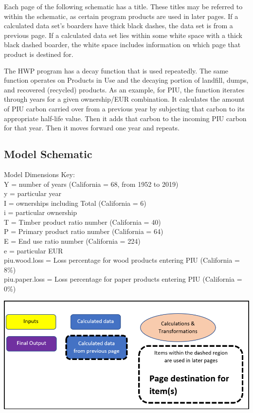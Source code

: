 \documentclass[
  openany]{book}
\begin{document}
Each page of the following schematic has a title. These titles may be referred to within the schematic, as certain program products are used in later pages. If a calculated data set's boarders have thick black dashes, the data set is from a previous page. If a calculated data set lies within some white space with a thick black dashed boarder, the white space includes information on which page that product is destined for.

The HWP program has a decay function that is used repeatedly. The same function operates on Products in Use and the decaying portion of landfill, dumps, and recovered (recycled) products. As an example, for PIU, the function iterates through years for a given ownership/EUR combination. It calculates the amount of PIU carbon carried over from a previous year by subjecting that carbon to its appropriate half-life value. Then it adds that carbon to the incoming PIU carbon for that year. Then it moves forward one year and repeats.

\newpage

\hypertarget{model-func-schem}{%
\subsection{Model Schematic}\label{model-func-schem}}

Model Dimensions Key:\\
Y = number of years (California = 68, from 1952 to 2019)\\
y = particular year\\
I = ownerships including Total (California = 6)\\
i = particular ownership\\
T = Timber product ratio number (California = 40)\\
P = Primary product ratio number (California = 64)\\
E = End use ratio number (California = 224)\\
e = particular EUR\\
piu.wood.loss = Loss percentage for wood products entering PIU (California = 8\%)\\
piu.paper.loss = Loss percentage for paper products entering PIU (California = 0\%)

\includegraphics[width=1\linewidth]{images/schematic-0}
\end{document}
